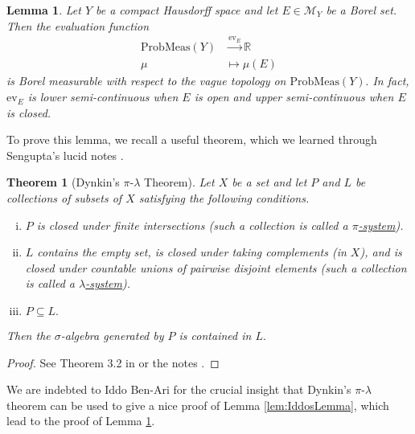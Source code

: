 \documentclass[12pt]{article}
\edef\t{\pgfmathresult}%
\theoremstyle{theorem}
\newtheorem{theorem}[equation]{Theorem}
\newtheorem{lemma}[equation]{Lemma}
\theoremstyle{definition}
\numberwithin{equation}{section}
\let\l=\lambda \let\r=\rho
\let\s=\sigma \let\t=\tau \let\u=\upsilon \let\f=\phi \let\c=\chi
\newcommand{\be}{\begin{equation}}
\newcommand{\ee}{\end{equation}}
\newcommand{\bt}{\begin{theorem}}
\newcommand{\et}{\end{theorem}}
\newcommand{\blem}{\begin{lemma}}
\newcommand{\elem}{\end{lemma}}
\newcommand{\bprf}{\begin{proof}}
\newcommand{\eprf}{\end{proof}}
\newcommand{\<}{\langle}
\renewcommand{\>}{\rangle}
\def\R{{{\mathbb R}}}
\begin{document}
\blem
\label{lem:evaluationofmeasurecontinuous}
Let $Y$ be a compact Hausdorff space 
and let $E\in\mathcal{M}_{Y}$ be a Borel set. Then the evaluation function 
\be
\begin{split}
\mathrm{ProbMeas}(Y)&\xrightarrow{\mathrm{ev}_{E}}\R\\
\mu&\mapsto\mu(E)
\end{split}
\ee
is Borel measurable with respect to the vague topology on 
$\mathrm{ProbMeas}(Y).$ %
In fact, $\mathrm{ev}_{E}$ is lower semi-continuous when $E$ is open
and upper semi-continuous when $E$ is closed. 
\elem

To prove this lemma, we recall %
a useful theorem, 
which we learned through Sengupta's lucid notes \cite{Se09}. 

\bt
[Dynkin's $\pi$-$\l$ Theorem]
\label{thm:Dynkin}
Let $X$ be a set and let $P$ and $L$ be collections of subsets of $X$
satisfying the following conditions. 
\begin{enumerate}[i.]
\setlength{\itemsep}{0pt}
\item
$P$ is closed under finite intersections (such a collection is called a
\emph{\uline{$\pi$-system}}).
\item
$L$ contains the empty set, is closed under taking complements (in $X$), 
and is closed under countable unions of pairwise disjoint elements (such
a collection is called a \emph{\uline{$\l$-system}}). 
\item
$P\subseteq L.$
\end{enumerate}
Then the $\s$-algebra generated by $P$ is contained in $L.$ 
\et

\bprf
See Theorem 3.2 in \cite{Bi95} or the notes \cite{Se09}. 
\eprf

We are indebted to Iddo Ben-Ari for the crucial insight that
Dynkin's $\pi$-$\l$ theorem can be used to give a nice proof
of Lemma \ref{lem:IddosLemma}, which lead to the proof of
Lemma \ref{lem:evaluationofmeasurecontinuous}. 
\end{document}
